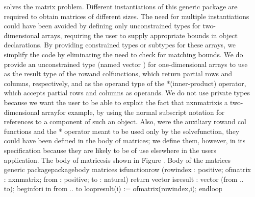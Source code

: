 \tyxffmxendmono[] solves the matrix problem. Different instantiations
of this generic package are required to obtain matrices of different
sizes. The need for multiple instantiations could have been avoided
by defining only unconstrained types for two-dimensional arrays, requiring
the user to supply appropriate bounds in object declarations. By providing
constrained types or subtypes for these arrays, we simplify the code
by eliminating the need to check for matching bounds. We do provide
an unconstrained type (named \tyxffmxmono[]vector%
\tyxffmxendmono[]) for one-dimensional arrays to use as the result
type of the \tyxffmxmono[]row\tyxffmxendmono[] and %
\tyxffmxmono[]col\tyxffmxendmono[] functions, which return partial
rows and columns, respectively, and as the operand type of the %
\tyxffmxmono[]*\tyxffmxendmono[] (inner-product) operator, which accepts
partial rows and columns as operands. We do not use private types
because we want the user to be able to exploit the fact that %
\tyxffmxmono[]nxn\Symuns[]matrix\tyxffmxendmono[] is a two-dimensional
array\EmDash[]for example, by using the normal subscript notation
for references to a component of such an object. Also, were the auxiliary
\tyxffmxmono[]row\tyxffmxendmono[] and \tyxffmxmono[]col%
\tyxffmxendmono[] functions and the \tyxffmxmono[]*%
\tyxffmxendmono[] operator meant to be used only by the %
\tyxffmxmono[]solve\tyxffmxendmono[] function, they could have been
defined in the body of \tyxffmxmono[]matrices\tyxffmxendmono[]; we
define them, however, in its specification because they are likely
to be of use elsewhere in the user\rsquo[]s application.%
\Endpara[]
\Para[]The body of \tyxffmxmono[]matrices\tyxffmxendmono[] is shown
in Figure .
\Parbox[]
Body of the \tyxffmxmono[]matrices%
\tyxffmxendmono[] generic package\FgEndcap[]
\Comp[]\tyxtstxbf[]package\tyxtstxendbf[] \tyxtstxbf[]body%
\tyxtstxendbf[] matrices \tyxtstxbf[]is\tyxtstxendbf[]
   \tyxtstxbf[]function\tyxtstxendbf[] row (row\Symuns[]index : positive;
                 of\Symuns[]matrix : nxn\Symuns[]matrix;
                 from      : positive;
                 to        : natural) \tyxtstxbf[]return%
\tyxtstxendbf[] vector \tyxtstxbf[]is\tyxtstxendbf[]
      result : vector (from .. to);
   \tyxtstxbf[]begin\tyxtstxendbf[]
      \tyxtstxbf[]for\tyxtstxendbf[] i \tyxtstxbf[]in%
\tyxtstxendbf[] from .. to \tyxtstxbf[]loop\tyxtstxendbf[]
         result(i) := of\Symuns[]matrix(row\Symuns[]index,i);
      \tyxtstxbf[]end\tyxtstxendbf[] \tyxtstxbf[]loop%
